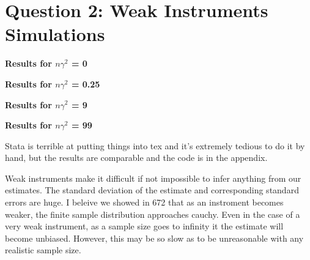 \documentclass[11pt]{article}
\begin{document}

\section{Question 2: Weak Instruments Simulations}

\begin{center}
	
	\centering
	
	\textbf{Results for $n \gamma^2$ = 0}\par\medskip
	\scalebox{1}{
		
	}
\end{center}

\begin{center}
	
	\centering
	
	\textbf{Results for $n \gamma^2$ = 0.25}\par\medskip
	\scalebox{1}{
		
	}
\end{center}

\begin{center}
	
	\centering
	
	\textbf{Results for $n \gamma^2$ = 9}\par\medskip
	\scalebox{1}{
		
	}
\end{center}

\begin{center}
	
	\centering
	
	\textbf{Results for $n \gamma^2$ = 99}\par\medskip
	\scalebox{1}{
		
	}
\end{center}

Stata is terrible at putting things into tex and it's extremely tedious to do it by hand, but the results are comparable and the code is in the appendix. 

Weak instruments make it difficult if not impossible to infer anything from our estimates. The standard deviation of the estimate and corresponding standard errors are huge. I beleive we showed in 672 that as an instroment becomes weaker, the finite sample distribution approaches cauchy. Even in the case of a very weak instrument, as a sample size goes to infinity it the estimate will become unbiased. However, this may be so slow as to be unreasonable with any realistic sample size. 
\end{document}
